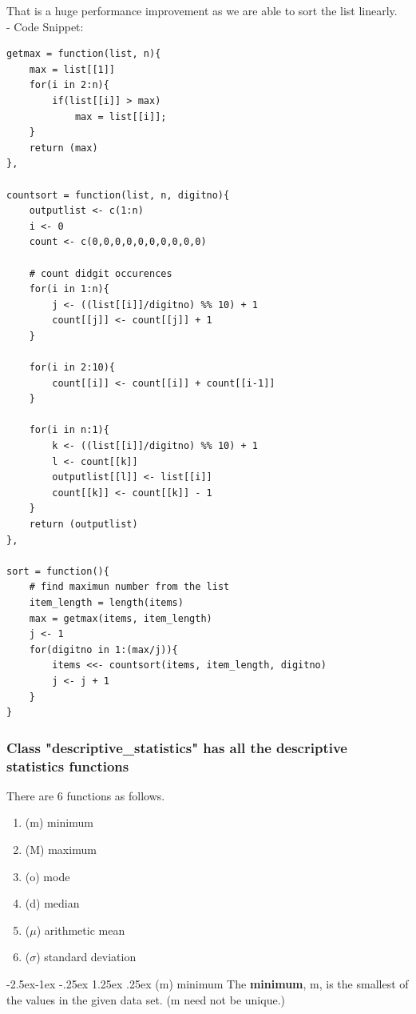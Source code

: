 \documentclass[11pt]{article}
\makeatletter
\renewcommand\paragraph{\@startsection{paragraph}{4}{\z@}%
            {-2.5ex\@plus -1ex \@minus -.25ex}%
            {1.25ex \@plus .25ex}%
            {\normalfont\normalsize\bfseries}}
\makeatother
\begin{document}
That is a huge performance improvement as we are able to sort the list linearly.\\

- Code Snippet:\\

\begin{lstlisting}
getmax = function(list, n){
    max = list[[1]]
    for(i in 2:n){
        if(list[[i]] > max)
            max = list[[i]];
    }
    return (max)
},

countsort = function(list, n, digitno){
    outputlist <- c(1:n)
    i <- 0
    count <- c(0,0,0,0,0,0,0,0,0,0)

    # count didgit occurences
    for(i in 1:n){
        j <- ((list[[i]]/digitno) %% 10) + 1 
        count[[j]] <- count[[j]] + 1 
    }
    
    for(i in 2:10){
        count[[i]] <- count[[i]] + count[[i-1]] 
    }
    
    for(i in n:1){
        k <- ((list[[i]]/digitno) %% 10) + 1
        l <- count[[k]]
        outputlist[[l]] <- list[[i]]
        count[[k]] <- count[[k]] - 1
    }
    return (outputlist)
},

sort = function(){
    # find maximun number from the list
    item_length = length(items)
    max = getmax(items, item_length)
    j <- 1
    for(digitno in 1:(max/j)){
        items <<- countsort(items, item_length, digitno)
        j <- j + 1
    }
}
\end{lstlisting}

\subsubsection{Class "descriptive\_statistics" has all the descriptive statistics functions}

There are 6 functions as follows.

\begin{enumerate}
	\item (m) minimum
	\item (M) maximum
    \item (o) mode
    \item (d) median
    \item ($\mu$) arithmetic mean
    \item ($\sigma$) standard deviation
\end{enumerate}

\paragraph{(m) minimum}
The \textbf{minimum}, m, is the smallest of the values in the given data set. (m need not be unique.)\\
\end{document}
